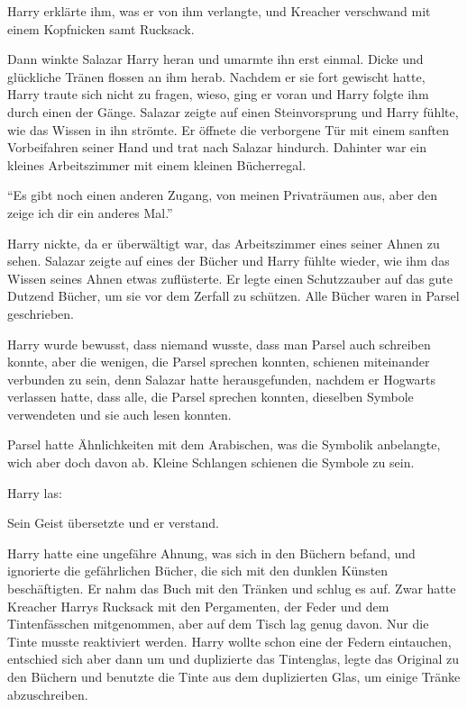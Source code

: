 Harry erklärte ihm, was er von ihm verlangte, und Kreacher verschwand mit einem Kopfnicken samt Rucksack.

Dann winkte Salazar Harry heran und umarmte ihn erst einmal. Dicke und glückliche Tränen flossen an ihm herab. Nachdem er sie fort gewischt hatte, Harry traute sich nicht zu fragen, wieso, ging er voran und Harry folgte ihm durch einen der Gänge. Salazar zeigte auf einen Steinvorsprung und Harry fühlte, wie das Wissen in ihn strömte. Er öffnete die verborgene Tür mit einem sanften Vorbeifahren seiner Hand und trat nach Salazar hindurch. Dahinter war ein kleines Arbeitszimmer mit einem kleinen Bücherregal.

\enquote{Es gibt noch einen anderen Zugang, von meinen Privaträumen aus, aber den zeige ich dir ein anderes Mal.}

Harry nickte, da er überwältigt war, das Arbeitszimmer eines seiner Ahnen zu sehen. Salazar zeigte auf eines der Bücher und Harry fühlte wieder, wie ihm das Wissen seines Ahnen etwas zuflüsterte. Er legte einen Schutzzauber auf das gute Dutzend Bücher, um sie vor dem Zerfall zu schützen. Alle Bücher waren in Parsel geschrieben.

Harry wurde bewusst, dass niemand wusste, dass man Parsel auch schreiben konnte, aber die wenigen, die Parsel sprechen konnten, schienen miteinander verbunden zu sein, denn Salazar hatte herausgefunden, nachdem er Hogwarts verlassen hatte, dass alle, die Parsel sprechen konnten, dieselben Symbole verwendeten und sie auch lesen konnten.

Parsel hatte Ähnlichkeiten mit dem Arabischen, was die Symbolik anbelangte, wich aber doch davon ab. Kleine Schlangen schienen die Symbole zu sein.

Harry las: 

Sein Geist übersetzte und er verstand. 

Harry hatte eine ungefähre Ahnung, was sich in den Büchern befand, und ignorierte die gefährlichen Bücher, die sich mit den dunklen Künsten beschäftigten. Er nahm das Buch mit den Tränken und schlug es auf. Zwar hatte Kreacher Harrys Rucksack mit den Pergamenten, der Feder und dem Tintenfässchen mitgenommen, aber auf dem Tisch lag genug davon. Nur die Tinte musste reaktiviert werden. Harry wollte schon eine der Federn eintauchen, entschied sich aber dann um und duplizierte das Tintenglas, legte das Original zu den Büchern und benutzte die Tinte aus dem duplizierten Glas, um einige Tränke abzuschreiben.

